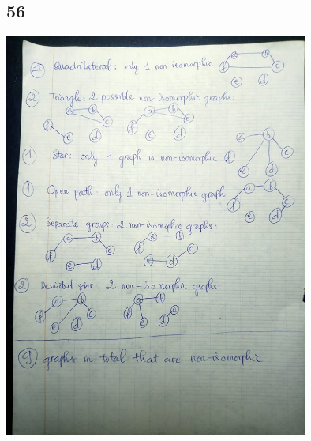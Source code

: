\documentclass[12pt]{article}
\begin{document}
\begin{multicols}{2}
    \section*{56}
      \begin{center}
        \includegraphics[width=10cm]{56.jpg}
      \end{center}
  \end{multicols}
\end{document}
